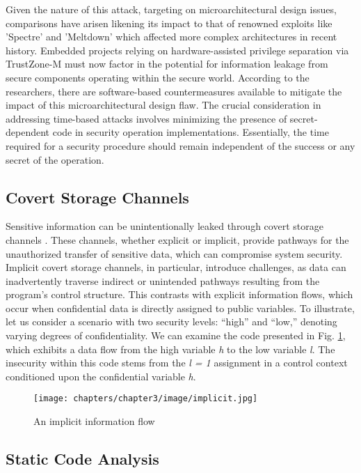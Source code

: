 Given the nature of this attack, targeting on microarchitectural design issues, comparisons have arisen likening its impact to that of renowned exploits like 'Spectre' and 'Meltdown' which affected more complex architectures in recent history. Embedded projects relying on hardware-assisted privilege separation via TrustZone-M must now factor in the potential for information leakage from secure components operating within the secure world. According to the researchers, there are software-based countermeasures available to mitigate the impact of this microarchitectural design flaw. The crucial consideration in addressing time-based attacks involves minimizing the presence of secret-dependent code in security operation implementations. Essentially, the time required for a security procedure should remain independent of the success or any secret of the operation.

\subsection{Covert Storage Channels}

Sensitive information can be unintentionally leaked through covert storage channels \cite{storagechannel, sabelfeld}. These channels, whether explicit or implicit, provide pathways for the unauthorized transfer of sensitive data, which can compromise system security. Implicit covert storage channels, in particular, introduce challenges, as data can inadvertently traverse indirect or unintended pathways resulting from the program's control structure. This contrasts with explicit information flows, which occur when confidential data is directly assigned to public variables. To illustrate, let us consider a scenario with two security levels: ``high'' and ``low,'' denoting varying degrees of confidentiality. We can examine the code presented in Fig. \ref{fig:implicit}, which exhibits a data flow from the high variable \textit{h} to the low variable \textit{l}. The insecurity within this code stems from the \textit{l = 1} assignment in a control context conditioned upon the confidential variable \textit{h}.

 \begin{figure}
  \centering
  \medskip
  \texttt{[image: chapters/chapter3/image/implicit.jpg]}
  \caption[Short caption for Table of Figures]{An implicit information flow}
  \label{fig:implicit}
\end{figure}

\subsection{Static Code Analysis}

